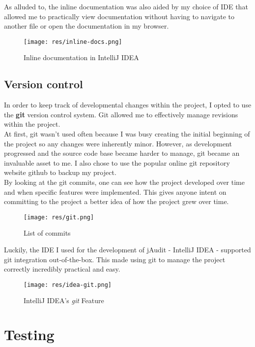 \documentclass[9pt]{article}
\begin{document}
		As alluded to, the inline documentation was also aided by my choice of
		IDE that allowed me to practically view documentation without having to
		navigate to another file or open the documentation in my browser.\\

		\begin{figure}[H]
			\centering
			\texttt{[image: res/inline-docs.png]}
			\caption{Inline documentation in IntelliJ IDEA}
		\end{figure}

	\subsection{Version control}

		In order to keep track of developmental changes within the project, I
		opted to use the \textbf{git} version control system. Git allowed me to
		effectively manage revisions within the project.\\

		At first, git wasn't used often because I was busy creating the initial
		beginning of the project so any changes were inherently minor. However,
		as development progressed and the source code base became harder to
		manage, git became an invaluable asset to me. I also chose to use the
		popular online git repository website github to backup my project.\\

		By looking at the git commits, one can see how the project developed
		over time and when specific features were implemented. This gives
		anyone intent on committing to the project a better idea of how the
		project grew over time. 

		\begin{figure}[H]
			\centering
			\texttt{[image: res/git.png]}
			\caption{List of commits}
		\end{figure}

		Luckily, the IDE I used for the development of jAudit - IntelliJ IDEA -
		supported git integration out-of-the-box. This made using git to manage
		the project correctly incredibly practical and easy.
		
		\begin{figure}[H]
			\centering
			\texttt{[image: res/idea-git.png]}
			\caption{IntelliJ IDEA's \textit{git} Feature}
		\end{figure}

\section{Testing}
\end{document}
